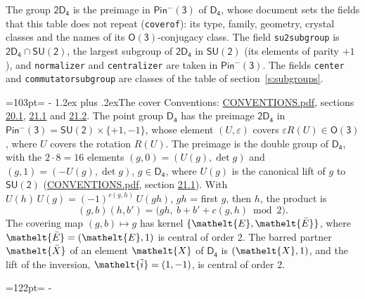 \documentclass[10pt,a4paper]{article}
\makeatletter
\renewcommand\section{\@startsection{section}{1}{\z@}{-3ex plus -1ex minus -.2ex}%
  {1.2ex plus .2ex}{\normalfont\large\sffamily\bfseries\color{parttitle}}}
\newcommand{\needspace}[1]{\par\penalty-100\begingroup\dimen0=#1\relax\dimen2=\pagegoal
  \advance\dimen2-\pagetotal\ifdim\dimen0>\dimen2\relax\ifdim\dimen2>0pt\vfil\break\fi\fi
  \endgroup}
\numberwithin{equation}{section}
\newcommand{\eltfont}[1]{{\let\sigma\eltsigma\mathelt{#1}}}
\newcommand{\grp}[1]{\mathsf{#1}}
\newcommand{\elt}[1]{\eltfont{#1}}
\newcommand{\dirprod}{\times}
\newcommand{\barred}[1]{\bar{#1}}
\newcommand{\lift}[1]{\tilde{#1}}
\makeatother
\begin{document}
\leavevmode\label{n:element.inversion}\label{n:group.preimage}The group $\grp{2D_{4}}$ is the preimage in $\grp{Pin^{-}(3)}$ of \href{../../../rotation/data/pdf/D4.pdf}{$\grp{D_{4}}$}, whose document sets the fields that this table does not repeat (\texttt{coverof}): its type, family, geometry, crystal classes and the names of its \href{../../../rotation/data/pdf/O3.pdf}{$\grp{O(3)}$}-conjugacy class. The field \texttt{su2subgroup} is $\grp{2D_{4}} \cap \grp{SU(2)}$, the largest subgroup of $\grp{2D_{4}}$ in $\grp{SU(2)}$ (its elements of parity $+1$), and \texttt{normalizer} and \texttt{centralizer} are taken in $\grp{Pin^{-}(3)}$. The fields \texttt{center} and \texttt{commutatorsubgroup} are classes of the table of section~\ref{s:subgroups}.
\needspace{103pt}
\section{The cover}\label{s:cover}
Conventions: \href{../../CONVENTIONS.pdf}{CONVENTIONS.pdf}, sections \href{../../CONVENTIONS.pdf\#conv.20.1}{20.1}, \href{../../CONVENTIONS.pdf\#conv.21.1}{21.1} and \href{../../CONVENTIONS.pdf\#conv.21.2}{21.2}.
\leavevmode\label{n:group.pin.minus}\label{n:group.su2}\label{n:local.pin.sign}\label{n:matrix.covered}\label{n:matrix.lift.su2}\label{n:index.bar}The point group $\grp{D_{4}}$ has the preimage $\grp{2D_{4}}$ in $\grp{Pin^{-}(3)} = \grp{SU(2)} \dirprod \{+1, -1\}$, whose element $(U, \varepsilon)$ covers $\varepsilon R(U) \in \grp{O(3)}$, where $U$ covers the rotation $R(U)$. The preimage is the double group of $\grp{D_{4}}$, with the $2 \cdot 8 = 16$ elements $(g, 0) = (U(g), \det g)$ and $(g, 1) = (-U(g), \det g)$, $g \in \grp{D_{4}}$, where $U(g)$ is the canonical lift of $g$ to $\grp{SU(2)}$ (\href{../../CONVENTIONS.pdf}{CONVENTIONS.pdf}, section \href{../../CONVENTIONS.pdf\#conv.21.1}{21.1}). \label{n:function.cocycle}With $U(h)\,U(g) = (-1)^{c(g,h)}\,U(gh)$, $gh$ = first $g$, then $h$, the product is
\begin{equation}\label{e:product}(g, b)(h, b') = \bigl(gh,\ b + b' + c(g, h) \bmod 2\bigr).\end{equation}
\leavevmode\label{n:mark.bar}The covering map $(g, b) \mapsto g$ has kernel $\{\elt{E}, \elt{\barred{E}}\}$, where $\elt{\barred{E}} = (\elt{E}, 1)$ is central of order 2. \label{n:element.named}\label{n:mark.lift}The barred partner $\elt{\barred{X}}$ of an element $\elt{X}$ of $\grp{D_{4}}$ is $(\elt{X}, 1)$, and the lift of the inversion, $\elt{\lift{i}} = (1, -1)$, is central of order 2.
\needspace{122pt}
\end{document}
